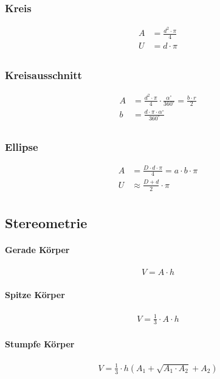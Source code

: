 \subsubsection{Kreis}
\begin{align*}
    A &= \frac{d^2 \cdot \pi}{4} \\
    U &= d \cdot \pi \\
\end{align*}

\subsubsection{Kreisausschnitt}
\begin{align*}
    A &= \frac{d^2 \cdot \pi}{4} \cdot \frac{\alpha^\circ}{360^\circ} = \frac{b \cdot r}{2} \\
    b &= \frac{d \cdot \pi \cdot \alpha^\circ }{ 360^\circ} \\
\end{align*}

\subsubsection{Ellipse}
\begin{align*}
    A &= \frac{D \cdot d \cdot \pi}{4} = a \cdot b \cdot \pi \\
    U &\approx \frac{D+d}{2} \cdot \pi \\
\end{align*}


\subsection{Stereometrie}
\paragraph{Gerade Körper}
\begin{align*}
    V = A \cdot h
\end{align*}

\paragraph{Spitze Körper}
\begin{align*}
    V = \frac{1}{3} \cdot A \cdot h
\end{align*}

\paragraph{Stumpfe Körper}
\begin{align*}
    V = \frac{1}{3} \cdot h ( A_1 + \sqrt{A_1 \cdot A_2} + A_2)
\end{align*}

